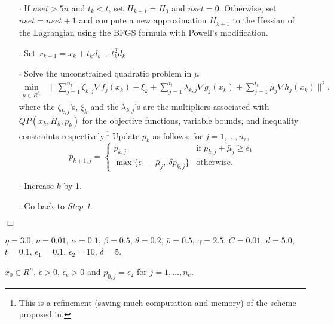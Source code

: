 \smallskip
\smallskip
{} 
\begin{itemize}
\item[$\cdot$] If $nset>5n$ and $t_k<\underline t$, set $H_{k+1}=H_0$ 
and $nset=0$.
Otherwise, set $nset=nset+1$ and compute a new approximation $H_{k+1}$ 
to the Hessian of the Lagrangian using the BFGS formula with Powell's 
modification\Lspace {}\Rcitemark \Rspace{}.
\item[$\cdot$] Set $x_{k+1}=x_{k}+t_{k}d_{k}+t_{k}^{2}\tilde d_{k}$.
\item[$\cdot$] Solve the unconstrained 
quadratic problem in $\bar{\mu}$
$$\begin{array}{cl}
\min\limits_{\bar{\mu}\in R^{t_e}} &
\|\sum\limits_{j=1}^{n_f}\zeta _{k,j}\nabla f_j(x_k)+
\xi_k+\sum\limits_{j=1}^{t_i}\lambda_{k,j}\nabla g_j(x_k)
  +\sum\limits_{j=1}^{t_e}\bar{\mu}_j\nabla h_j(x_k)\|^2,
\end{array}$$
where the $\zeta_{k,j}$'s, $\xi_k$ and the $\lambda_{k,j}$'s
are the multipliers associated with $QP(x_k,H_k,p_k)$ for the objective
functions, variable bounds, and inequality constraints 
respectively.\footnote{This is a refinement (saving much computation
and memory) of the scheme proposed in\Lspace {}\Rcitemark \Rspace{}.}
Update $p_k$ as follows: for $j=1,\ldots,n_e$,
$$p_{k+1,j}=\left\{\begin{array}{ll}
p_{k,j} & \mbox{if } p_{k,j}+\bar\mu_j \geq \epsilon_1\\
\max\{\epsilon_1-\bar\mu_j,~\delta p_{k,j}\} & \mbox{otherwise.}
\end{array}\right.$$
\item[$\cdot$] Increase $k$ by 1.
\item[$\cdot$] Go back to {\it Step 1}.
\end{itemize}

\hfill{\large \bf $\Box$}
 
\vspace{1em}

\vspace{1em}
 $\eta =3.0$, $\nu=0.01$,
$\alpha=0.1$, $\beta=0.5$, $\theta=0.2$, $\bar{\rho}=0.5$, $\gamma = 2.5$,
$\underline{C}=0.01$, $\underline{d}=5.0$, $\underline t=0.1$,
$\epsilon_1=0.1$, $\epsilon_2=10$, $\delta=5$.

\smallskip
{} $x_0\in R^n$, $\epsilon > 0$, $\epsilon_e>0$ and
$p_{0,j}=\epsilon_2$ for $j=1, \ldots, n_e$. 

